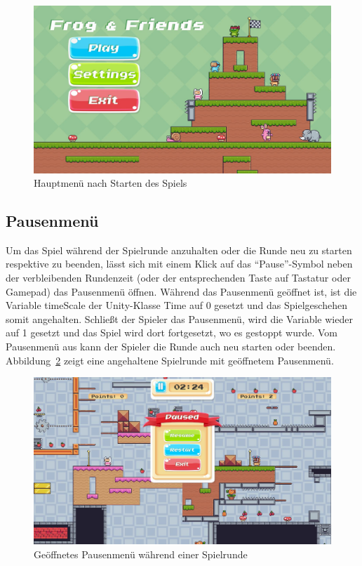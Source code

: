 \begin{figure}[th]
\centering
\includegraphics[width=150mm]{Figures/main-menu.jpg}
\decoRule
\caption[Hauptmenü]{Hauptmenü nach Starten des Spiels}
\label{fig:main-menu}
\end{figure}

\subsection{Pausenmenü}
Um das Spiel während der Spielrunde anzuhalten oder die Runde neu zu starten respektive zu beenden, lässt sich mit einem Klick auf das \enquote{Pause}-Symbol neben der verbleibenden Rundenzeit (oder der entsprechenden Taste auf Tastatur oder Gamepad) das Pausenmenü öffnen. Während das Pausenmenü geöffnet ist, ist die Variable timeScale der Unity-Klasse Time auf 0 gesetzt und das Spielgeschehen somit angehalten. Schließt der Spieler das Pausenmenü, wird die Variable wieder auf 1 gesetzt und das Spiel wird dort fortgesetzt, wo es gestoppt wurde. Vom Pausenmenü aus kann der Spieler die Runde auch neu starten oder beenden.\\

Abbildung~\ref{fig:pause-menu} zeigt eine angehaltene Spielrunde mit geöffnetem Pausenmenü.\\

\begin{figure}[th]
\centering
\includegraphics[width=150mm]{Figures/pause-menu.jpg}
\decoRule
\caption[Pausenmenü]{Geöffnetes Pausenmenü während einer Spielrunde}
\label{fig:pause-menu}
\end{figure}

